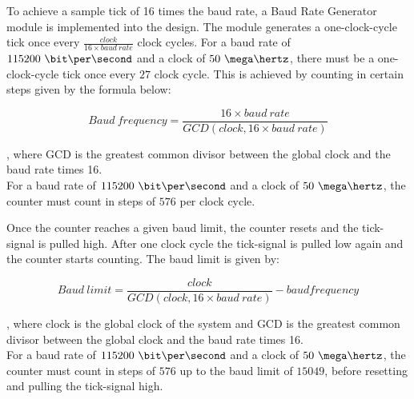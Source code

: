 \documentclass[main.tex]{subfiles}
\begin{document}
To achieve a sample tick of 16 times the baud rate, a Baud Rate Generator module is implemented into the design. The module generates a one-clock-cycle tick once every $\frac{clock}{16 \times baud\ rate}$ clock cycles. For a baud rate of $115200\ \bit\per\second$ and a clock of $50\ \mega\hertz$, there must be a one-clock-cycle tick once every $27$ clock cycle. This is achieved by counting in certain steps given by the formula below:

\begin{equation}
Baud\ frequency = \frac{16 \times baud\ rate}{GCD(clock, 16 \times baud\ rate)}
\end{equation}

, where GCD is the greatest common divisor between the global clock and the baud rate times 16. \cite{velure10} \\
For a baud rate of $115200\ \bit\per\second$ and a clock of $50\ \mega\hertz$, the counter must count in steps of $576$ per clock cycle. 

Once the counter reaches a given baud limit, the counter resets and the tick-signal is pulled high. After one clock cycle the tick-signal is pulled low again and the counter starts counting. The baud limit is given by:

\begin{equation}
Baud\ limit= \frac{clock}{GCD(clock, 16 \times baud\ rate)} - baud frequency
\end{equation}

, where clock is the global clock of the system and GCD is the greatest common divisor between the global clock and the baud rate times 16. \cite{velure10} \\
For a baud rate of $115200\ \bit\per\second$ and a clock of $50\ \mega\hertz$, the counter must count in steps of $576$ up to the baud limit of $15049$, before resetting and pulling the tick-signal high. 
\end{document}

